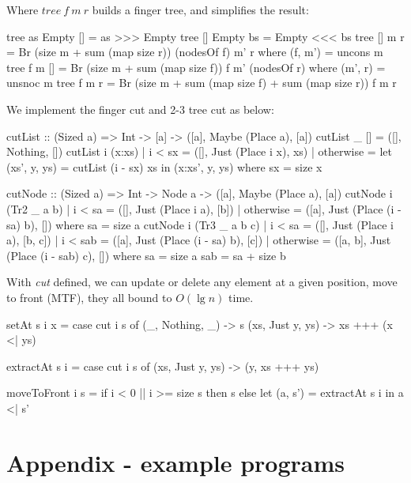 \documentclass[b5paper]{article}
\begin{document}
\begin{Answer}[ref = {ex:finger-tree-index}]
{Where $tree\ f\ m\ r$ builds a finger tree, and simplifies the result:

\begin{Haskell}
tree as Empty [] = as >>> Empty
tree [] Empty bs = Empty <<< bs
tree [] m r = Br (size m + sum (map size r)) (nodesOf f) m' r
    where (f, m') = uncons m
tree f m [] = Br (size m + sum (map size f)) f m' (nodesOf r)
    where (m', r) = unsnoc m
tree f m r = Br (size m + sum (map size f) + sum (map size r)) f m r
\end{Haskell}

We implement the finger cut and 2-3 tree cut as below:

\begin{Haskell}
cutList :: (Sized a) => Int -> [a] -> ([a], Maybe (Place a), [a])
cutList _ [] = ([], Nothing, [])
cutList i (x:xs) | i < sx = ([], Just (Place i x), xs)
                 | otherwise = let (xs', y, ys) = cutList (i - sx) xs
                               in (x:xs', y, ys)
  where sx = size x

cutNode :: (Sized a) => Int -> Node a -> ([a], Maybe (Place a), [a])
cutNode i (Tr2 _ a b) | i < sa = ([], Just (Place i a), [b])
                      | otherwise = ([a], Just (Place (i - sa) b), [])
  where sa = size a
cutNode i (Tr3 _ a b c) | i < sa = ([], Just (Place i a), [b, c])
                        | i < sab = ([a], Just (Place (i - sa) b), [c])
                        | otherwise = ([a, b], Just (Place (i - sab) c), [])
  where sa = size a
        sab = sa + size b
\end{Haskell}

With \textit{cut} defined, we can update or delete any element at a given position, move to front (MTF), they all bound to $O(\lg n)$ time.

\begin{Haskell}
setAt s i x = case cut i s of
  (_, Nothing, _) -> s
  (xs, Just y, ys) -> xs +++ (x <| ys)

extractAt s i = case cut i s of (xs, Just y, ys) -> (y, xs +++ ys)

moveToFront i s = if i < 0 || i >= size s then s
                  else let (a, s') = extractAt s i in a <| s'
\end{Haskell}
}
\end{Answer}

\section{Appendix - example programs}
\end{document}
